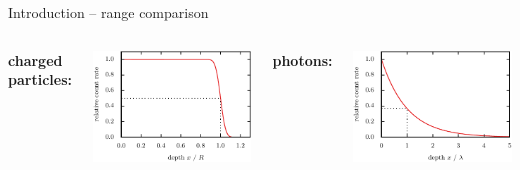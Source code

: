 \documentclass[11pt,xcolor=dvipsnames,professionalfonts]{beamer}
\begin{document}
\begin{frame}{Introduction -- range comparison}
	
	\begin{columns}
		\centering
		\hspace{1cm}\textbf{charged particles:}
		
		\vspace{0.5cm}
		
		\includegraphics[width=1.0\textwidth]{./figures/range.pdf}
		
		\centering
		\hspace{1cm}\textbf{photons:}
		
		\vspace{0.5cm}
		
		\includegraphics[width=1.0\textwidth]{./figures/lambert_beer_exp.pdf}
		
	\end{columns}
\end{frame}
\end{document}
